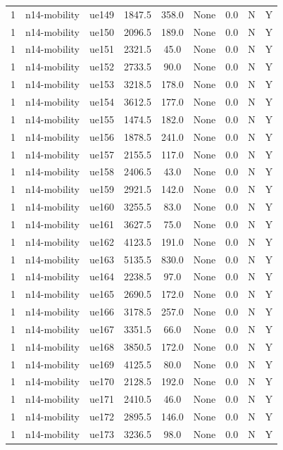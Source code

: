 \begin{table}[ht]
\begin{tabular}{|c|c|c|c|c|c|c|c|c|}
1 & n14-mobility & ue149 & 1847.5 & 358.0 & None & 0.0 & N & Y \\
1 & n14-mobility & ue150 & 2096.5 & 189.0 & None & 0.0 & N & Y \\
1 & n14-mobility & ue151 & 2321.5 & 45.0 & None & 0.0 & N & Y \\
1 & n14-mobility & ue152 & 2733.5 & 90.0 & None & 0.0 & N & Y \\
1 & n14-mobility & ue153 & 3218.5 & 178.0 & None & 0.0 & N & Y \\
1 & n14-mobility & ue154 & 3612.5 & 177.0 & None & 0.0 & N & Y \\
1 & n14-mobility & ue155 & 1474.5 & 182.0 & None & 0.0 & N & Y \\
1 & n14-mobility & ue156 & 1878.5 & 241.0 & None & 0.0 & N & Y \\
1 & n14-mobility & ue157 & 2155.5 & 117.0 & None & 0.0 & N & Y \\
1 & n14-mobility & ue158 & 2406.5 & 43.0 & None & 0.0 & N & Y \\
1 & n14-mobility & ue159 & 2921.5 & 142.0 & None & 0.0 & N & Y \\
1 & n14-mobility & ue160 & 3255.5 & 83.0 & None & 0.0 & N & Y \\
1 & n14-mobility & ue161 & 3627.5 & 75.0 & None & 0.0 & N & Y \\
1 & n14-mobility & ue162 & 4123.5 & 191.0 & None & 0.0 & N & Y \\
1 & n14-mobility & ue163 & 5135.5 & 830.0 & None & 0.0 & N & Y \\
1 & n14-mobility & ue164 & 2238.5 & 97.0 & None & 0.0 & N & Y \\
1 & n14-mobility & ue165 & 2690.5 & 172.0 & None & 0.0 & N & Y \\
1 & n14-mobility & ue166 & 3178.5 & 257.0 & None & 0.0 & N & Y \\
1 & n14-mobility & ue167 & 3351.5 & 66.0 & None & 0.0 & N & Y \\
1 & n14-mobility & ue168 & 3850.5 & 172.0 & None & 0.0 & N & Y \\
1 & n14-mobility & ue169 & 4125.5 & 80.0 & None & 0.0 & N & Y \\
1 & n14-mobility & ue170 & 2128.5 & 192.0 & None & 0.0 & N & Y \\
1 & n14-mobility & ue171 & 2410.5 & 46.0 & None & 0.0 & N & Y \\
1 & n14-mobility & ue172 & 2895.5 & 146.0 & None & 0.0 & N & Y \\
1 & n14-mobility & ue173 & 3236.5 & 98.0 & None & 0.0 & N & Y \\

\end{tabular}
\end{table}
